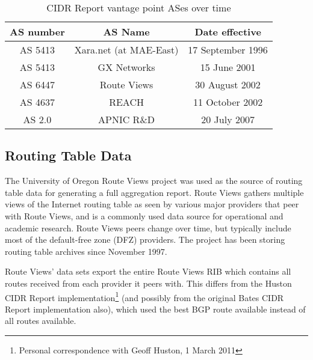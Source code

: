 \begin{table}[h]
    \begin{center}
    \caption{CIDR Report vantage point ASes over time}
    \vspace{1em}
    \begin{tabular}{c | c | c}
        AS number & AS Name & Date effective \\
        \hline
        AS 5413 & Xara.net (at MAE-East) & 17 September 1996 \\
        AS 5413 & GX Networks & 15 June 2001 \\
        AS 6447 & Route Views & 30 August 2002 \\
        AS 4637 & REACH & 11 October 2002 \\
        AS 2.0  & APNIC R\&D & 20 July 2007 \\
    \end{tabular}
    \end{center}
\end{table}

\subsection{Routing Table Data}

The University of Oregon Route Views project \cite{routeviews} was used as the source of routing table data for generating a full aggregation report. Route Views gathers multiple views of the Internet routing table as seen by various major providers that peer with Route Views, and is a commonly used data source for operational and academic research. Route Views peers change over time, but typically include most of the default-free zone (DFZ) providers. The project has been storing routing table archives since November 1997.

Route Views' data sets export the entire Route Views RIB which contains all routes received from each provider it peers with. This differs from the Huston CIDR Report implementation\footnote{Personal correspondence with Geoff Huston, 1 March 2011} (and possibly from the original Bates CIDR Report implementation also), which used the best BGP route available instead of all routes available.



